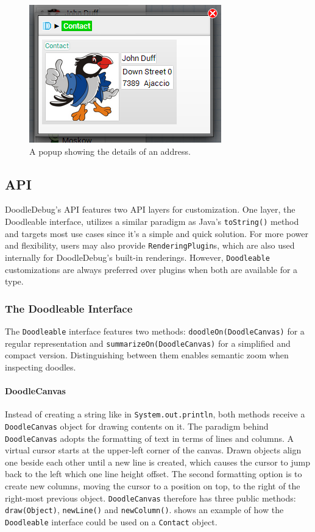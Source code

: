 \documentclass[english]{scrartcl}
\newcommand{\DD}{Dood\-le\-De\-bug\xspace}
\newcommand{\println}{\texttt{Sys\-tem.\-out.\-println}\xspace}
\begin{document}
\begin{figure}[h]
	\includegraphics{img/AddressBook_contact.png}
	\caption[Contact visualization]{A popup showing the details of an address.}
\end{figure}

\subsection{API}
\DD's API features two API layers for customization.
One layer, the Doodleable interface, utilizes a similar paradigm as Java's \texttt{toString()} method and targets most use cases since it's a simple and quick solution.
For more power and flexibility, users may also provide \texttt{RenderingPlugin}s, which are also used internally for \DD's built-in renderings.
However, \texttt{Doodleable} customizations are always preferred over plugins when both are available for a type.

\subsubsection{The Doodleable Interface}

The \texttt{Doodleable} interface features two methods: \texttt{doodleOn(DoodleCanvas)} for a regular representation and \texttt{summarizeOn(DoodleCanvas)} for a simplified and compact version.
Distinguishing between them enables semantic zoom \cite{semantic-zoom} when inspecting doodles.

\paragraph{DoodleCanvas}
Instead of creating a string like in \println, both methods receive a \texttt{DoodleCanvas} object for drawing contents on it.
The paradigm behind \texttt{DoodleCanvas} adopts the formatting of text in terms of lines and columns.
A virtual cursor starts at the upper-left corner of the canvas.
Drawn objects align one beside each other until a new line is created, which causes the cursor to jump back to the left which one line height offset.
The second formatting option is to create new columns, moving the cursor to a position on top, to the right of the right-most previous object.
\texttt{DoodleCanvas} therefore has three public methods: \texttt{draw(Object)}, \texttt{newLine()} and \texttt{newColumn()}.
 shows an example of how the \texttt{Doodleable} interface could be used on a \texttt{Contact} object.
\end{document}
